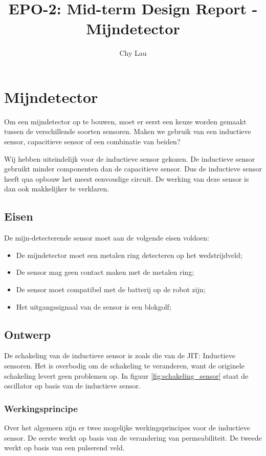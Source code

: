 \documentclass{report}
\title{EPO-2: Mid-term Design Report - Mijndetector}
\author{Chy Lau}
\begin{document}
\chapter{Mijndetector}
\label{ch:mijn}
Om een mijndetector op te bouwen, moet er eerst een keuze worden gemaakt tussen de verschillende soorten sensoren. Maken we gebruik van een inductieve sensor, capacitieve sensor of een combinatie van beiden?

Wij hebben uiteindelijk voor de inductieve sensor gekozen. De inductieve sensor gebruikt minder componenten dan de capacitieve sensor. Dus de inductieve sensor heeft qua opbouw het meest eenvoudige circuit. De werking van deze sensor is dan ook makkelijker te verklaren. 

\section{Eisen}
\label{sec:eisen}
De mijn-detecterende sensor moet aan de volgende eisen voldoen: 
\begin{itemize}
\item De mijndetector moet een metalen ring detecteren op het wedstrijdveld;
\item De sensor mag geen contact maken met de metalen ring;
\item De sensor moet compatibel met de batterij op de robot zijn; 
\item Het uitgangssignaal van de sensor is een blokgolf;
\end{itemize}

\section{Ontwerp}
\label{sec:ontwerp}
De schakeling van de inductieve sensor is zoals die van de JIT: Inductieve sensoren. Het is overbodig om de schakeling te veranderen, want de originele schakeling levert geen problemen op. In figuur \ref{fig:schakeling_sensor} staat de oscillator op basis van de inductieve sensor.

\subsection{Werkingsprincipe}
\label{ssec:werking}
Over het algemeen zijn er twee mogelijke werkingsprincipes voor de inductieve sensor. De eerste werkt op basis van de verandering van permeabiliteit. De tweede werkt op basis van een pulserend veld. 
\end{document}
